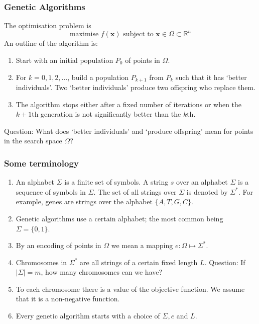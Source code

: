 \documentclass{beamer}
\begin{document}
\begin{frame}
\frametitle{Genetic Algorithms}
The optimisation problem is
\begin{equation}\label{e1}
\text{maximise } f(\bm{x})
\text{ subject to } \bm{x} \in \Omega \subset \mathbb{R}^n
\end{equation}
An outline of the algorithm is:
\begin{enumerate}
\item Start with an initial population $P_0$ of points in $\Omega$.
\item For $k =0, 1, 2, \ldots$, build a population $P_{k+1}$ from $P_k$ such 
that it has `better individuals'. Two `better individuals' produce two 
offspring who replace them.
\item The algorithm stops either after a fixed number of iterations or when the
$k+1$th generation is not significantly better than the $k$th.
\end{enumerate}
Question: What does `better individuals' and `produce offspring' mean for 
points in the search space $\Omega$?
\end{frame}

\begin{frame}
\frametitle{Some terminology}
\begin{enumerate}
\item An alphabet $\Sigma$ is a finite set of symbols. A string $s$ over an
alphabet $\Sigma$ is a sequence of symbols in $\Sigma$. The set of all strings
over $\Sigma$ is denoted by $\Sigma^\ast$. For example, genes are strings over 
the alphabet $\{A, T, G, C\}$.
\item Genetic algorithms use a certain alphabet; the most common being $\Sigma
= \{0, 1\}$.
\item By an encoding of points in $\Omega$ we mean a mapping $e:\Omega \mapsto
\Sigma^\ast$.
\item Chromosomes in $\Sigma^\ast$ are all strings of a certain fixed length 
$L$. Question: If $|\Sigma| = m$, how many chromosomes can we have?
\item To each chromosome there is a value of the objective function. We assume
that it is a non-negative function.
\item Every genetic algorithm starts with a choice of $\Sigma, e$ and $L$.
\end{enumerate}
\end{frame}
\end{document}
